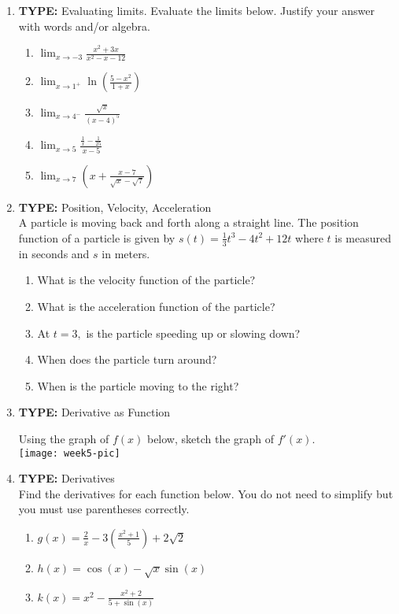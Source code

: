 \documentclass[11pt,fleqn]{article}
\begin{document}
\begin{enumerate}
\item \textbf{TYPE:} Evaluating limits.
Evaluate the limits below. Justify your answer with words and/or algebra.
\begin{multicols}{3}
\begin{enumerate}
	\item$\displaystyle{\lim_{x\to-3 }\frac{x^2+3x}{x^2-x-12}}$
	\item $\displaystyle{\lim_{x\to1^+} \ln\left(\frac{5-x^2}{1+x}\right) }$
	\item $\displaystyle{\lim_{x\to4^-}\frac{\sqrt{x}}{(x-4)^5} }$
	\item $\displaystyle{\lim_{x\to 5}\frac{\frac{1}{x}-\frac{1}{25}}{x-5}}$
	\item $\displaystyle{\lim_{x\to 7}\left(x+\frac{x-7}{\sqrt{x}-\sqrt{7}}\right)}$
\end{enumerate} 
\end{multicols}

\item \textbf{TYPE:} Position, Velocity, Acceleration\\
A particle is moving back and forth along a straight line. The position function of a particle is given by $s(t)=\frac{1}{3}t^3-4t^2+12t$ where $t$ is measured in seconds and $s$ in meters.  
\begin{enumerate}
	\item What is the velocity function of the particle?
	\item What is the acceleration function of the particle?
	\item At $t=3,$ is the particle speeding up or slowing down?
	\item When does the particle turn around?
	\item When is the particle moving to the right?
\end{enumerate} 

\item \textbf{TYPE:} Derivative as Function
\begin{multicols}{2}
Using the graph of $f(x)$ below, sketch the graph of $f'(x).$\\
\texttt{[image: week5-pic]}
\end{multicols}

\item \textbf{TYPE:} Derivatives\\
Find the derivatives for each function below. You do not need to simplify but you must use parentheses correctly.
\begin{enumerate}
	\item $g(x)=\frac{2}{x}-3\left(\frac{x^2+1}{5}\right)+2\sqrt{2}$
	\item $h(x)=\cos(x) - \sqrt{x} \sin(x)$
	\item $k(x)= x^2-\frac{x^2+2}{5+\sin(x)}$
\end{enumerate} 


\end{enumerate}
\end{document}

